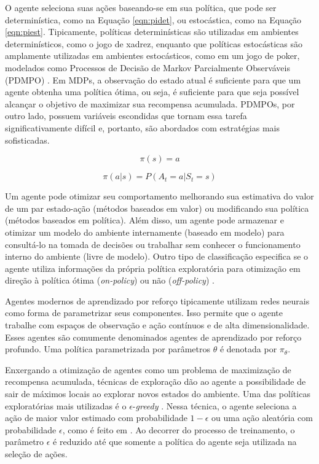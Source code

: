 O agente seleciona suas ações baseando-se em sua política, que pode ser determinística, como na Equação \ref{eqn:pidet}, ou estocástica, como na Equação \ref{eqn:piest}. Tipicamente, políticas determinísticas são utilizadas em ambientes determinísticos, como o jogo de xadrez, enquanto que políticas estocásticas são amplamente utilizadas em ambientes estocásticos, como em um jogo de poker, modelados como Processos de Decisão de Markov Parcialmente Observáveis (PDMPO) \cite{drlhandson}. Em MDPs, a observação do estado atual é suficiente para que um agente obtenha uma política ótima, ou seja, é suficiente para que seja possível alcançar o objetivo de maximizar sua recompensa acumulada. PDMPOs, por outro lado, possuem variáveis escondidas que tornam essa tarefa significativamente difícil e, portanto, são abordados com estratégias mais sofisticadas.

\begin{equation}
\label{eqn:pidet}
\pi(s) = a
\end{equation}

\begin{equation}
\label{eqn:piest}
\pi(a|s) = P(A_t=a | S_t=s)
\end{equation}

Um agente pode otimizar seu comportamento melhorando sua estimativa do valor de um par estado-ação (métodos baseados em valor) ou modificando sua política (métodos baseados em política). Além disso, um agente pode armazenar e otimizar um modelo do ambiente internamente (baseado em modelo) para consultá-lo na tomada de decisões ou trabalhar sem conhecer o funcionamento interno do ambiente (livre de modelo). Outro tipo de classificação especifica se o agente utiliza informações da própria política exploratória para otimização em direção à política ótima (\textit{on-policy}) ou não (\textit{off-policy}) \cite{suttonbarto}.

Agentes modernos de aprendizado por reforço tipicamente utilizam redes neurais como forma de parametrizar seus componentes. Isso permite que o agente trabalhe com espaços de observação e ação contínuos e de alta dimensionalidade. Esses agentes são comumente denominados agentes de aprendizado por reforço profundo. Uma política parametrizada por parâmetros $\theta$ é denotada por $\pi_\theta$.

Enxergando a otimização de agentes como um problema de maximização de recompensa acumulada, técnicas de exploração dão ao agente a possibilidade de sair de máximos locais ao explorar novos estados do ambiente. Uma das políticas exploratórias mais utilizadas é o $\epsilon$-\textit{greedy} \cite{egreedy}. Nessa técnica, o agente seleciona a ação de maior valor estimado com probabilidade $1-\epsilon$ ou uma ação aleatória com probabilidade $\epsilon$, como é feito em \cite{deepq}. Ao decorrer do processo de treinamento, o parâmetro $\epsilon$ é reduzido até que somente a política do agente seja utilizada na seleção de ações. 

